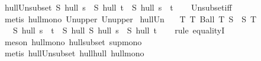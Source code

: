 \begin{isabellebody}
\endisatagproof
{\isafoldproof}%
%
\isadelimproof
\isanewline
%
\endisadelimproof
\isanewline
{}\isamarkupfalse%
\ hull{\isacharunderscore}{\kern0pt}Un{\isacharunderscore}{\kern0pt}subset{\isacharcolon}{\kern0pt}\ {\isachardoublequoteopen}{\isacharparenleft}{\kern0pt}S\ hull\ s{\isacharparenright}{\kern0pt}\ {\isasymunion}\ {\isacharparenleft}{\kern0pt}S\ hull\ t{\isacharparenright}{\kern0pt}\ {\isasymsubseteq}\ {\isacharparenleft}{\kern0pt}S\ hull\ {\isacharparenleft}{\kern0pt}s\ {\isasymunion}\ t{\isacharparenright}{\kern0pt}{\isacharparenright}{\kern0pt}{\isachardoublequoteclose}\isanewline
%
\isadelimproof
\ \ %
\endisadelimproof
%
\isatagproof
{}\isamarkupfalse%
\ Un{\isacharunderscore}{\kern0pt}subset{\isacharunderscore}{\kern0pt}iff\ \isamarkupfalse%
\ {\isacharparenleft}{\kern0pt}metis\ hull{\isacharunderscore}{\kern0pt}mono\ Un{\isacharunderscore}{\kern0pt}upper{}\ Un{\isacharunderscore}{\kern0pt}upper{}{\isacharparenright}{\kern0pt}%
\endisatagproof
{\isafoldproof}%
%
\isadelimproof
\isanewline
%
\endisadelimproof
\isanewline
{}\isamarkupfalse%
\ hull{\isacharunderscore}{\kern0pt}Un{\isacharcolon}{\kern0pt}\isanewline
\ \ \ T{\isacharcolon}{\kern0pt}\ {\isachardoublequoteopen}{\isasymAnd}T{\isachardot}{\kern0pt}\ Ball\ T\ S\ {\isasymLongrightarrow}\ S\ {\isacharparenleft}{\kern0pt}{\isasymInter}T{\isacharparenright}{\kern0pt}{\isachardoublequoteclose}\isanewline
\ \ \ {\isachardoublequoteopen}S\ hull\ {\isacharparenleft}{\kern0pt}s\ {\isasymunion}\ t{\isacharparenright}{\kern0pt}\ {\isacharequal}{\kern0pt}\ S\ hull\ {\isacharparenleft}{\kern0pt}S\ hull\ s\ {\isasymunion}\ S\ hull\ t{\isacharparenright}{\kern0pt}{\isachardoublequoteclose}\isanewline
%
\isadelimproof
\ \ %
\endisadelimproof
%
\isatagproof
{}\isamarkupfalse%
\ {\isacharparenleft}{\kern0pt}rule\ equalityI{\isacharparenright}{\kern0pt}\isanewline
\ \ \isamarkupfalse%
\ {\isacharparenleft}{\kern0pt}meson\ hull{\isacharunderscore}{\kern0pt}mono\ hull{\isacharunderscore}{\kern0pt}subset\ sup{\isachardot}{\kern0pt}mono{\isacharparenright}{\kern0pt}\isanewline
\ \ \isamarkupfalse%
\ {\isacharparenleft}{\kern0pt}metis\ hull{\isacharunderscore}{\kern0pt}Un{\isacharunderscore}{\kern0pt}subset\ hull{\isacharunderscore}{\kern0pt}hull\ hull{\isacharunderscore}{\kern0pt}mono{\isacharparenright}{\kern0pt}%
\endisatagproof
{\isafoldproof}%
%
\isadelimproof
\isanewline
%
\endisadelimproof
\isanewline
{}\isamarkupfalse%

\end{isabellebody}
